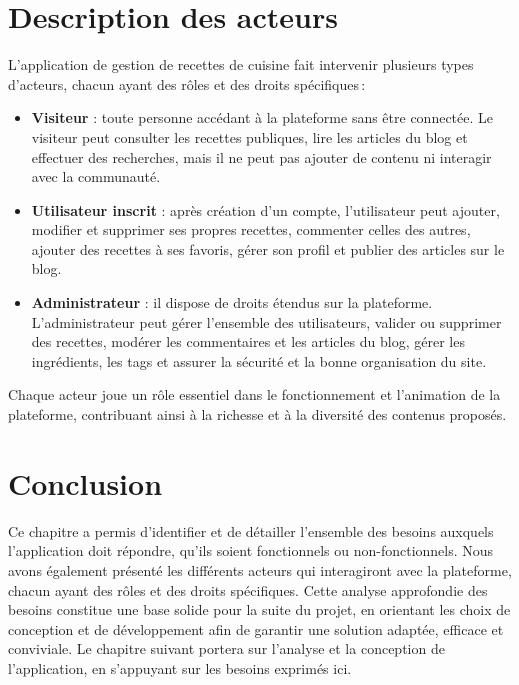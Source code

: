\documentclass[12pt,a4paper]{report}
\begin{document}
\section{Description des acteurs}

L’application de gestion de recettes de cuisine fait intervenir plusieurs types d’acteurs, chacun ayant des rôles et des droits spécifiques :

\begin{itemize}
    \item \textbf{Visiteur} : toute personne accédant à la plateforme sans être connectée. Le visiteur peut consulter les recettes publiques, lire les articles du blog et effectuer des recherches, mais il ne peut pas ajouter de contenu ni interagir avec la communauté.
    \item \textbf{Utilisateur inscrit} : après création d’un compte, l’utilisateur peut ajouter, modifier et supprimer ses propres recettes, commenter celles des autres, ajouter des recettes à ses favoris, gérer son profil et publier des articles sur le blog.
    \item \textbf{Administrateur} : il dispose de droits étendus sur la plateforme. L’administrateur peut gérer l’ensemble des utilisateurs, valider ou supprimer des recettes, modérer les commentaires et les articles du blog, gérer les ingrédients, les tags et assurer la sécurité et la bonne organisation du site.
\end{itemize}

Chaque acteur joue un rôle essentiel dans le fonctionnement et l’animation de la plateforme, contribuant ainsi à la richesse et à la diversité des contenus proposés.
\section*{Conclusion}


Ce chapitre a permis d’identifier et de détailler l’ensemble des besoins auxquels l’application doit répondre, qu’ils soient fonctionnels ou non-fonctionnels. Nous avons également présenté les différents acteurs qui interagiront avec la plateforme, chacun ayant des rôles et des droits spécifiques. Cette analyse approfondie des besoins constitue une base solide pour la suite du projet, en orientant les choix de conception et de développement afin de garantir une solution adaptée, efficace et conviviale. Le chapitre suivant portera sur l’analyse et la conception de l’application, en s’appuyant sur les besoins exprimés ici.
\newpage
\end{document}
